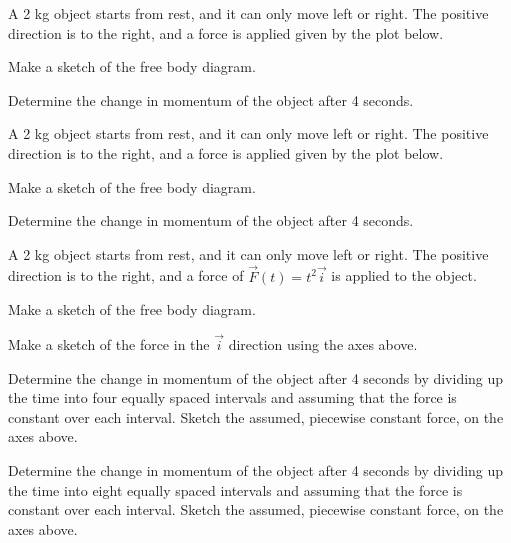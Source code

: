\begin{problem}
\item A 2 kg object starts from rest, and it can only move left or
  right. The positive direction is to the right, and a force is
  applied given by the plot below.

  \scalebox{0.5}{}

  \begin{subproblem}
    \item Make a sketch of the free body diagram.
      \vspace{4em}
    \item Determine the change in momentum of the object after 4
      seconds.
      \vfill
  \end{subproblem}
  \clearpage

\item A 2 kg object starts from rest, and it can only move left or
  right. The positive direction is to the right, and a force is
  applied given by the plot below.

  \scalebox{0.5}{}

  \begin{subproblem}
    \item Make a sketch of the free body diagram.
      \vspace{4em}
    \item Determine the change in momentum of the object after 4
      seconds.
      \vfill
  \end{subproblem}
  \clearpage

\item A 2 kg object starts from rest, and it can only move left or
  right. The positive direction is to the right, and a force of
  $\vec{F}(t)=t^2 \vec{i}$ is applied to the object.

  \scalebox{0.5}{}

  \begin{subproblem}
    \item Make a sketch of the free body diagram.
      \vspace{4em}
    \item Make a sketch of the force in the $\vec{i}$ direction using
      the axes above.
    \item Determine the change in momentum of the object after 4
      seconds by dividing up the time into four equally spaced
      intervals and assuming that the force is constant over each
      interval. Sketch the assumed, piecewise constant force, on the
      axes above.
      \vfill
    \item Determine the change in momentum of the object after 4
      seconds by dividing up the time into eight equally spaced
      intervals and assuming that the force is constant over each
      interval. Sketch the assumed, piecewise constant force, on the
      axes above.
      \vfill
  \end{subproblem}
  \clearpage

\end{problem}

